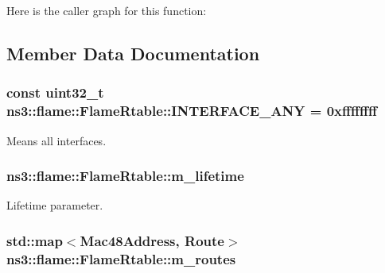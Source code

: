 Here is the caller graph for this function\+:




\subsection{Member Data Documentation}
\subsubsection[{\texorpdfstring{I\+N\+T\+E\+R\+F\+A\+C\+E\+\_\+\+A\+NY}{INTERFACE_ANY}}]{\setlength{\rightskip}{0pt plus 5cm}const uint32\+\_\+t ns3\+::flame\+::\+Flame\+Rtable\+::\+I\+N\+T\+E\+R\+F\+A\+C\+E\+\_\+\+A\+NY = 0xffffffff\hspace{0.3cm}{\ttfamily [static]}}\hypertarget{classns3_1_1flame_1_1FlameRtable_a355b8bbdfec725bb9ccfddc8f3302573}{}\label{classns3_1_1flame_1_1FlameRtable_a355b8bbdfec725bb9ccfddc8f3302573}


Means all interfaces. 

\subsubsection[{\texorpdfstring{m\+\_\+lifetime}{m_lifetime}}]{ ns3\+::flame\+::\+Flame\+Rtable\+::m\+\_\+lifetime\hspace{0.3cm}{\ttfamily [private]}}\hypertarget{classns3_1_1flame_1_1FlameRtable_a9f63125b32a74d7ce4f6108b5b2be95c}{}\label{classns3_1_1flame_1_1FlameRtable_a9f63125b32a74d7ce4f6108b5b2be95c}


Lifetime parameter. 

\subsubsection[{\texorpdfstring{m\+\_\+routes}{m_routes}}]{\setlength{\rightskip}{0pt plus 5cm}std\+::map$<${\bf Mac48\+Address}, {\bf Route}$>$ ns3\+::flame\+::\+Flame\+Rtable\+::m\+\_\+routes\hspace{0.3cm}{\ttfamily [private]}}\hypertarget{classns3_1_1flame_1_1FlameRtable_a7053e8224a71c8ad083ac1df806b19d4}{}\label{classns3_1_1flame_1_1FlameRtable_a7053e8224a71c8ad083ac1df806b19d4}


